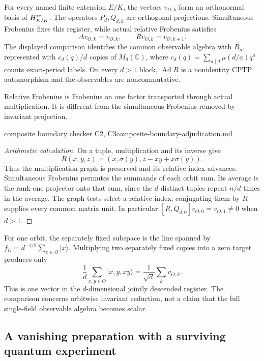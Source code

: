 \begin{proposition}
\statusSketch\quad
For every named finite extension $E/K$, the vectors $v_{O,k}$ form an
orthonormal basis of $H_{E/K}^{\rm rel}$. The operators $P_d,Q_{d,k}$
are orthogonal projections. Simultaneous Frobenius fixes this register,
while actual relative Frobenius satisfies
\[
 \Delta v_{O,k}=v_{O,k},\qquad Rv_{O,k}=v_{O,k+1}.
\]
The displayed comparison identifies the common observable algebra with
$B_n$, represented with $c_d(q)/d$ copies of $M_d(\mathbb C)$, where
$c_d(q)=\sum_{a\mid d}\mu(d/a)q^a$ counts exact-period labels.
On every $d>1$ block, $\operatorname{Ad}R$ is a nonidentity CPTP
automorphism and the observables are noncommutative.
\end{proposition}
\begin{scope}
Relative Frobenius is Frobenius on one factor transported through actual
multiplication. It is different from the simultaneous Frobenius removed
by invariant projection.
\end{scope}
{composite boundary checker C2, C3}{composite-boundary-adjudication.md}

\begin{proof}[Arithmetic calculation]
On a tuple, multiplication and its inverse give
\[
 R(x,y,z)=(x,\sigma(y),z-xy+x\sigma(y)).
\]
Thus the multiplication graph is preserved and its relative index advances.
Simultaneous Frobenius permutes the summands of each orbit sum. Its
average is the rank-one projector onto that sum, since the $d$ distinct
tuples repeat $n/d$ times in the average. The graph tests select a relative
index; conjugating them by $R$ supplies every common matrix unit.
In particular $[R,Q_{d,0}]v_{O,0}=v_{O,1}\ne0$ when $d>1$.
\end{proof}

For one orbit, the separately fixed subspace is the line spanned by
$f_O=d^{-1/2}\sum_{x\in O}|x\rangle$. Multiplying two separately fixed
copies into a zero target produces only
\[
 \frac1d\sum_{x,y\in O}|x,y,xy\rangle
       =\frac1{\sqrt d}\sum_kv_{O,k}.
\]
This is one vector in the $d$-dimensional jointly descended register.
The comparison concerns orbitwise invariant reduction, not a claim that
the full single-field observable algebra becomes scalar.

\subsection{A vanishing preparation with a surviving quantum experiment}

